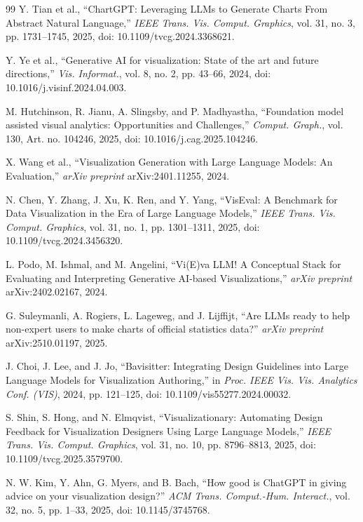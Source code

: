 \documentclass[conference]{IEEEtran}
\begin{document}
\begin{thebibliography}{99}
Y. Tian et al., ``ChartGPT: Leveraging LLMs to Generate Charts From Abstract Natural Language,'' \emph{IEEE Trans. Vis. Comput. Graphics}, vol. 31, no. 3, pp. 1731--1745, 2025, doi: 10.1109/tvcg.2024.3368621.

Y. Ye et al., ``Generative AI for visualization: State of the art and future directions,'' \emph{Vis. Informat.}, vol. 8, no. 2, pp. 43--66, 2024, doi: 10.1016/j.visinf.2024.04.003.

M. Hutchinson, R. Jianu, A. Slingsby, and P. Madhyastha, ``Foundation model assisted visual analytics: Opportunities and Challenges,'' \emph{Comput. Graph.}, vol. 130, Art. no. 104246, 2025, doi: 10.1016/j.cag.2025.104246.

X. Wang et al., ``Visualization Generation with Large Language Models: An Evaluation,'' \emph{arXiv preprint} arXiv:2401.11255, 2024.

N. Chen, Y. Zhang, J. Xu, K. Ren, and Y. Yang, ``VisEval: A Benchmark for Data Visualization in the Era of Large Language Models,'' \emph{IEEE Trans. Vis. Comput. Graphics}, vol. 31, no. 1, pp. 1301--1311, 2025, doi: 10.1109/tvcg.2024.3456320.

L. Podo, M. Ishmal, and M. Angelini, ``Vi(E)va LLM! A Conceptual Stack for Evaluating and Interpreting Generative AI-based Visualizations,'' \emph{arXiv preprint} arXiv:2402.02167, 2024.

G. Suleymanli, A. Rogiers, L. Lageweg, and J. Lijffijt, ``Are LLMs ready to help non-expert users to make charts of official statistics data?'' \emph{arXiv preprint} arXiv:2510.01197, 2025.

J. Choi, J. Lee, and J. Jo, ``Bavisitter: Integrating Design Guidelines into Large Language Models for Visualization Authoring,'' in \emph{Proc. IEEE Vis. Vis. Analytics Conf. (VIS)}, 2024, pp. 121--125, doi: 10.1109/vis55277.2024.00032.

S. Shin, S. Hong, and N. Elmqvist, ``Visualizationary: Automating Design Feedback for Visualization Designers Using Large Language Models,'' \emph{IEEE Trans. Vis. Comput. Graphics}, vol. 31, no. 10, pp. 8796--8813, 2025, doi: 10.1109/tvcg.2025.3579700.

N. W. Kim, Y. Ahn, G. Myers, and B. Bach, ``How good is ChatGPT in giving advice on your visualization design?'' \emph{ACM Trans. Comput.-Hum. Interact.}, vol. 32, no. 5, pp. 1--33, 2025, doi: 10.1145/3745768.


\end{thebibliography}
\end{document}
